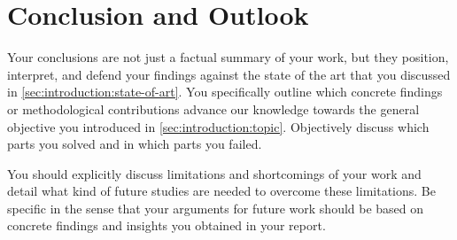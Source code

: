 \chapter{Conclusion and Outlook}\label{sec:conclusion}

Your conclusions are not just a factual summary of your work, but they position, interpret, and defend your findings against the state of the art that you discussed in \cref{sec:introduction:state-of-art}.
You specifically outline which concrete findings or methodological contributions advance our knowledge towards the general objective you introduced in \cref{sec:introduction:topic}.
Objectively discuss which parts you solved and in which parts you failed.

You should explicitly discuss limitations and shortcomings of your work and detail what kind of future studies are needed to overcome these limitations.
Be specific in the sense that your arguments for future work should be based on concrete findings and insights you obtained in your report.

